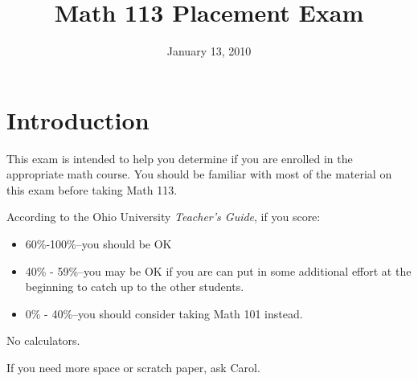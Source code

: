 \documentclass[fleqn,addpoints]{exam}
\title{Math 113 Placement Exam}
\author{}
\date{January 13, 2010}
\begin{document}
\maketitle

\vspace{0.2in}
\vspace{0.2in}

\begin{center}
\gradetable[h][pages]
\end{center}

\section{Introduction}

This exam is intended to help you determine if you are enrolled in the appropriate math course.  You should be familiar
with most of the material on this exam before taking Math 113.  

According to the Ohio University {\em Teacher's Guide}, if you score:

\begin{itemize}
  \item 60\%-100\%--you should be OK
  \item 40\% - 59\%--you may be OK if you are can put in some additional effort at the beginning to catch up to the other
    students. 
  \item 0\% - 40\%--you should consider taking Math 101 instead.
\end{itemize}

No calculators.

If you need more space or scratch paper, ask Carol.

\ifprintanswers

\vspace{0.5 in}
\end{document}
